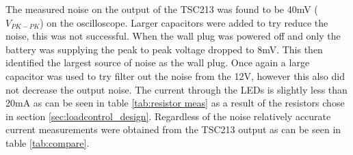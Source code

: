 The measured noise on the output of the TSC213 was found to be 40mV ($V_{PK-PK}$) on the oscilloscope. Larger capacitors were added to try reduce the noise, this was not successful. When the wall plug was powered off and only the battery was supplying the peak to peak voltage dropped to 8mV. This then identified the largest source of noise as the wall plug. Once again a large capacitor was used to try filter out the noise from the 12V, however this also did not decrease the output noise. The current through the LEDs is slightly less than 20mA as can be seen in table \ref{tab:resistor meas} as a result of the resistors chose in section \ref{sec:loadcontrol_design}. Regardless of the noise relatively accurate current measurements were obtained from the TSC213 output as can be seen in table \ref{tab:compare}.

\newpage
